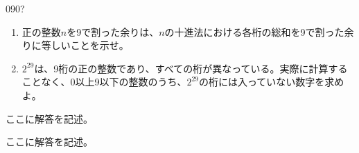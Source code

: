 \begin{prob}{090}{\hosi ?}{}
 \begin{enumerate}
  \item 正の整数$n$を9で割った余りは、$n$の十進法における各桁の総和を9で割った余りに等しいことを示せ。
  \item $2^{29}$は、9桁の正の整数であり、すべての桁が異なっている。実際に計算することなく、0以上9以下の整数のうち、$2^{29}$の桁には入っていない数字を求めよ。
 \end{enumerate}
\end{prob}
ここに解答を記述。

ここに解答を記述。
